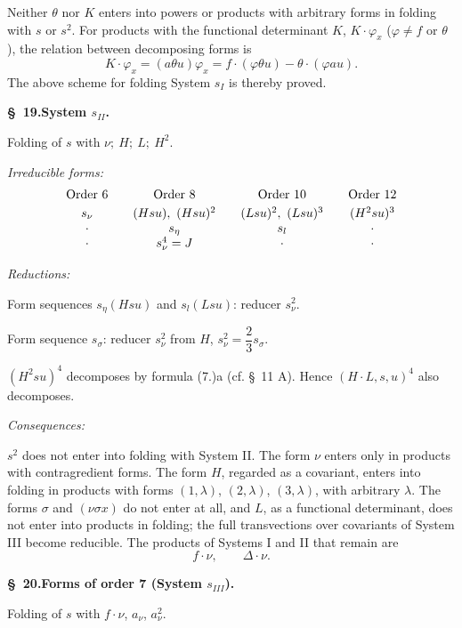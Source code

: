 \documentclass[11pt]{article}
\newcommand{\A}{\Delta}
\begin{document}
Neither $\theta$ nor $K$ enters into powers or products with arbitrary forms in folding with $s$ or $s^2$. For products with the functional determinant $K$, $K\cdot\varphi_x$ ($\varphi\ne f$ or $\theta$), the relation between decomposing forms is
\[
 K\cdot\varphi_x=(a\theta u)\varphi_x=f\cdot(\varphi\theta u)-\theta\cdot(\varphi au).
\]
The above scheme for folding System $s_I$ is thereby proved.

\begin{center}
\textbf{\S\ 19.\quad System $s_{II}$.}
\end{center}

Folding of $s$ with $\nu;\ H;\ L;\ H^2$.

\noindent\emph{Irreducible forms:}
\[
\begin{array}{c@{\qquad}c@{\qquad}c@{\qquad}c}
\text{Order 6} & \text{Order 8} & \text{Order 10} & \text{Order 12}\\[0.3em]
s_\nu & (Hsu),\ (Hsu)^2 & (Lsu)^2,\ (Lsu)^3 & (H^2su)^3\\
\cdot & s_\eta & s_l & \cdot\\
\cdot & s_\nu^4=J & \cdot & \cdot
\end{array}
\]

\noindent\emph{Reductions:}

Form sequences $s_\eta(Hsu)$ and $s_l(Lsu)$: reducer $s_\nu^2$.

Form sequence $s_\sigma$: reducer $s_\nu^2$ from $H$, $s_\nu^2=\dfrac23s_\sigma$.

$(H^2su)^4$ decomposes by formula (7.)a (cf. \S\ 11 A). Hence $(H\cdot L,s,u)^4$ also decomposes.

\noindent\emph{Consequences:}

$s^2$ does not enter into folding with System II. The form $\nu$ enters only in products with contragredient forms. The form $H$, regarded as a covariant, enters into folding in products with forms $(1,\lambda)$, $(2,\lambda)$, $(3,\lambda)$, with arbitrary $\lambda$. The forms $\sigma$ and $(\nu\sigma x)$ do not enter at all, and $L$, as a functional determinant, does not enter into products in folding; the full transvections over covariants of System III become reducible. The products of Systems I and II that remain are
\[
 f\cdot\nu,\qquad \A\cdot\nu.
\]

\begin{center}
\textbf{\S\ 20.\quad Forms of order 7 (System $s_{III}$).}
\end{center}

Folding of $s$ with $f\cdot\nu$, $a_\nu$, $a_\nu^2$.
\end{document}
